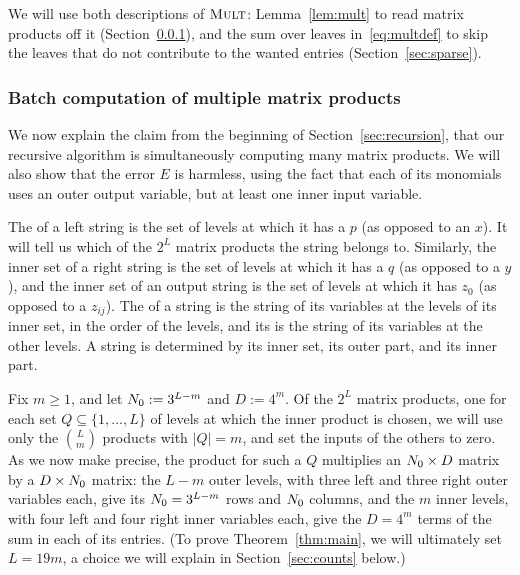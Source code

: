 We will use both descriptions of $\textnormal{\textsc{Mult}}$: Lemma~\ref{lem:mult} to read matrix products off it (Section~\ref{sec:defs}), and the sum over leaves in~\eqref{eq:multdef} to skip the leaves that do not contribute to the wanted entries (Section~\ref{sec:sparse}).

\subsubsection{Batch computation of multiple matrix products}\label{sec:defs}

We now explain the claim from the beginning of Section~\ref{sec:recursion}, that our recursive algorithm is simultaneously computing many matrix products. We will also show that the error $E$ is harmless, using the fact that each of its monomials uses an outer output variable, but at least one inner input variable.

The  of a left string is the set of levels at which it has a $p$ (as opposed to an $x$). It will tell us which of the $2^L$ matrix products the string belongs to. Similarly, the inner set of a right string is the set of levels at which it has a $q$ (as opposed to a $y$), and the inner set of an output string is the set of levels at which it has $z_0$ (as opposed to a $z_{ij}$). The  of a string is the string of its variables at the levels of its inner set, in the order of the levels, and its  is the string of its variables at the other levels. A string is determined by its inner set, its outer part, and its inner part.

Fix $m\ge1$, and let $N_0:=3^{L-m}$ and $D:=4^m$. Of the $2^L$ matrix products, one for each set $Q\subseteq\{1,\dots,L\}$ of levels at which the inner product is chosen, we will use only the $\binom Lm$ products with $|Q|=m$, and set the inputs of the others to zero. As we now make precise, the product for such a $Q$ multiplies an $N_0\times D$ matrix by a $D\times N_0$ matrix: the $L-m$ outer levels, with three left and three right outer variables each, give its $N_0=3^{L-m}$ rows and $N_0$ columns, and the $m$ inner levels, with four left and four right inner variables each, give the $D=4^m$ terms of the sum in each of its entries. (To prove Theorem~\ref{thm:main}, we will ultimately set $L=19m$, a choice we will explain in Section~\ref{sec:counts} below.) 

